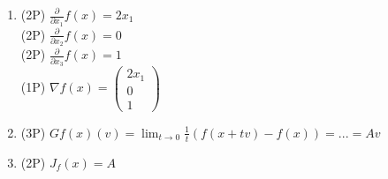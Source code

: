 {\color{solution}
\begin{enumerate}
\item \textcolor{exampoints}{(2P)}  $\frac{\partial}{\partial x_1} f(x) = 2x_1$\\
\textcolor{exampoints}{(2P)}  $\frac{\partial}{\partial x_2} f(x) = 0$\\
\textcolor{exampoints}{(2P)}  $\frac{\partial}{\partial x_3} f(x) = 1$\\
\textcolor{exampoints}{(1P)}  $\nabla f(x) = \begin{pmatrix}
 2x_1\\0\\1
\end{pmatrix}$ 
	\item \textcolor{exampoints}{(3P)} $Gf(x)(v)=\lim_{t\to 0}\frac{1}{t}(f(x+tv)-f(x))= ... = Av$
	\item \textcolor{exampoints}{(2P)} $J_f(x) = A$
\end{enumerate}
}

